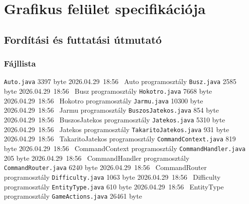 \chapter{Grafikus felület specifikációja}

\section{Fordítási és futtatási útmutató}

\subsection{Fájllista}

\begin{fajllista}
    \fajl
    {\texttt{Auto.java}} %
    {3397 byte} %
    {2026.04.29~18:56~} %
    {Auto programosztály} %
    \fajl
    {\texttt{Busz.java}} %
    {2585 byte} %
    {2026.04.29~18:56~} %
    {Busz programosztály} %
    \fajl
    {\texttt{Hokotro.java}} %
    {7668 byte} %
    {2026.04.29~18:56~} %
    {Hokotro programosztály} %
    \fajl
    {\texttt{Jarmu.java}} %
    {10300 byte} %
    {2026.04.29~18:56~} %
    {Jarmu programosztály} %
    \fajl
    {\texttt{BuszosJatekos.java}} %
    {854 byte} %
    {2026.04.29~18:56~} %
    {BuszosJatekos programosztály} %
    \fajl
    {\texttt{Jatekos.java}} %
    {5310 byte} %
    {2026.04.29~18:56~} %
    {Jatekos programosztály} %
    \fajl
    {\texttt{TakaritoJatekos.java}} %
    {931 byte} %
    {2026.04.29~18:56~} %
    {TakaritoJatekos programosztály} %
    \fajl
    {\texttt{CommandContext.java}} %
    {819 byte} %
    {2026.04.29~18:56~} %
    {CommandContext programosztály} %
    \fajl
    {\texttt{CommandHandler.java}} %
    {205 byte} %
    {2026.04.29~18:56~} %
    {CommandHandler programosztály} %
    \fajl
    {\texttt{CommandRouter.java}} %
    {6240 byte} %
    {2026.04.29~18:56~} %
    {CommandRouter programosztály} %
    \fajl
    {\texttt{Difficulty.java}} %
    {1063 byte} %
    {2026.04.29~18:56~} %
    {Difficulty programosztály} %
    \fajl
    {\texttt{EntityType.java}} %
    {610 byte} %
    {2026.04.29~18:56~} %
    {EntityType programosztály} %
    \fajl
    {\texttt{GameActions.java}} %
    {26461 byte} %

\end{fajllista}
